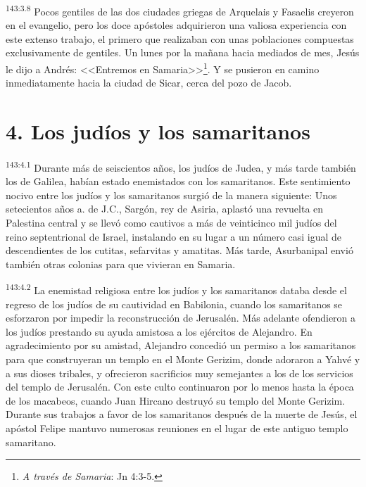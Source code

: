 \par 
\textsuperscript{143:3.8} Pocos gentiles de las dos ciudades griegas de Arquelais y Fasaelis creyeron en el evangelio, pero los doce apóstoles adquirieron una valiosa experiencia con este extenso trabajo, el primero que realizaban con unas poblaciones compuestas exclusivamente de gentiles. Un lunes por la mañana hacia mediados de mes, Jesús le dijo a Andrés: <<Entremos en Samaria>>\footnote{\textit{A través de Samaria}: Jn 4:3-5.}. Y se pusieron en camino inmediatamente hacia la ciudad de Sicar, cerca del pozo de Jacob.

\section*{4. Los judíos y los samaritanos}
\par 
\textsuperscript{143:4.1} Durante más de seiscientos años, los judíos de Judea, y más tarde también los de Galilea, habían estado enemistados con los samaritanos. Este sentimiento nocivo entre los judíos y los samaritanos surgió de la manera siguiente: Unos setecientos años a. de J.C., Sargón, rey de Asiria, aplastó una revuelta en Palestina central y se llevó como cautivos a más de veinticinco mil judíos del reino septentrional de Israel, instalando en su lugar a un número casi igual de descendientes de los cutitas, sefarvitas y amatitas. Más tarde, Asurbanipal envió también otras colonias para que vivieran en Samaria.

\par 
\textsuperscript{143:4.2} La enemistad religiosa entre los judíos y los samaritanos databa desde el regreso de los judíos de su cautividad en Babilonia, cuando los samaritanos se esforzaron por impedir la reconstrucción de Jerusalén. Más adelante ofendieron a los judíos prestando su ayuda amistosa a los ejércitos de Alejandro. En agradecimiento por su amistad, Alejandro concedió un permiso a los samaritanos para que construyeran un templo en el Monte Gerizim, donde adoraron a Yahvé y a sus dioses tribales, y ofrecieron sacrificios muy semejantes a los de los servicios del templo de Jerusalén. Con este culto continuaron por lo menos hasta la época de los macabeos, cuando Juan Hircano destruyó su templo del Monte Gerizim. Durante sus trabajos a favor de los samaritanos después de la muerte de Jesús, el apóstol Felipe mantuvo numerosas reuniones en el lugar de este antiguo templo samaritano.

